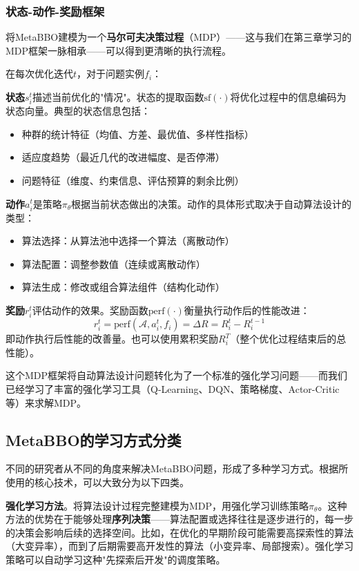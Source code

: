 \documentclass[lang=cn,zihao=-4,a4paper,fontset=windows]{beautybook}
\begin{document}
\subsubsection{状态-动作-奖励框架}

将MetaBBO建模为一个\textbf{马尔可夫决策过程}（MDP）——这与我们在第三章学习的MDP框架一脉相承——可以得到更清晰的执行流程。

在每次优化迭代$t$，对于问题实例$f_i$：

\textbf{状态}$s_i^t$描述当前优化的"情况"。状态的提取函数$\text{sf}(\cdot)$将优化过程中的信息编码为状态向量。典型的状态信息包括：
\begin{itemize}
    \item 种群的统计特征（均值、方差、最优值、多样性指标）
    \item 适应度趋势（最近几代的改进幅度、是否停滞）
    \item 问题特征（维度、约束信息、评估预算的剩余比例）
\end{itemize}

\textbf{动作}$a_i^t$是策略$\pi_\theta$根据当前状态做出的决策。动作的具体形式取决于自动算法设计的类型：
\begin{itemize}
    \item 算法选择：从算法池中选择一个算法（离散动作）
    \item 算法配置：调整参数值（连续或离散动作）
    \item 算法生成：修改或组合算法组件（结构化动作）
\end{itemize}

\textbf{奖励}$r_i^t$评估动作的效果。奖励函数$\text{perf}(\cdot)$衡量执行动作后的性能改进：
\[
r_i^t = \text{perf}(\mathcal{A}, a_i^t, f_i) = \Delta R = R_i^{t} - R_i^{t-1}
\]
即动作执行后性能的改善量。也可以使用累积奖励$R_i^T$（整个优化过程结束后的总性能）。

这个MDP框架将自动算法设计问题转化为了一个标准的强化学习问题——而我们已经学习了丰富的强化学习工具（Q-Learning、DQN、策略梯度、Actor-Critic等）来求解MDP。

\subsection{MetaBBO的学习方式分类}

不同的研究者从不同的角度来解决MetaBBO问题，形成了多种学习方式。根据所使用的核心技术，可以大致分为以下四类。

\textbf{强化学习方法}。将算法设计过程完整建模为MDP，用强化学习训练策略$\pi_\theta$。这种方法的优势在于能够处理\textbf{序列决策}——算法配置或选择往往是逐步进行的，每一步的决策会影响后续的选择空间。比如，在优化的早期阶段可能需要高探索性的算法（大变异率），而到了后期需要高开发性的算法（小变异率、局部搜索）。强化学习策略可以自动学习这种"先探索后开发"的调度策略。
\end{document}
